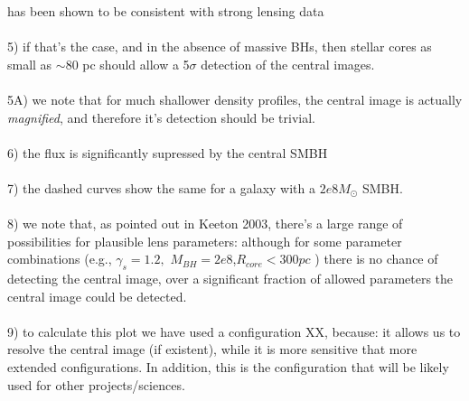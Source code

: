 \documentclass[chicago]{emulateapj}
\begin{document}
\begin{framed}
has been shown to be consistent with strong lensing data \\ \\
5) if that's the case, and in the absence of massive BHs, then stellar cores as small as $\sim80$ pc should allow a 5$\sigma$ detection of the central images. \\ \\
5A) we note that for much shallower density profiles, the central image is actually \emph{magnified}, and therefore it's detection should be trivial.\\ \\
6) the flux is significantly supressed by the central SMBH \\  \\
7) the dashed curves show the same for a galaxy with a $2e8M_{\odot}$ SMBH. \\ \\
8) we note that, as pointed out in Keeton 2003, there's a large range of possibilities for plausible lens parameters: although for some parameter combinations (e.g., $\gamma_{s}=1.2,$ $M_{BH} = 2e8$,$R_{core}<300 pc$ ) there is no chance of detecting the central image, over a significant fraction of allowed parameters the central image could be detected. \\ \\
9) to calculate this plot we have used a configuration XX, because: it allows us to resolve the central image (if existent), while it is more sensitive that more extended configurations.  In addition, this is the configuration that will be likely used for other projects/sciences.
\end{framed}
\end{document}
